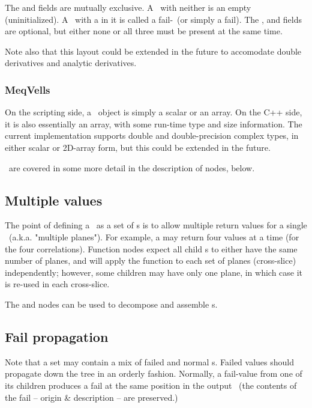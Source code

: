 \documentclass[10pt]{article}
\begin{document}
  The  and  fields are mutually exclusive. A \VellSet\ with
  neither is an empty (uninitialized). A \VellSet\ with a  in it is
  called a fail-\VellSet\ (or simply a fail). The ,
   and  fields are optional, but either
  none or all three must be present at the same time.
  
  Note also that this layout could be extended in the future to accomodate
  double derivatives and analytic derivatives.

\subsubsection{MeqVells}

  On the scripting side, a \Vells\ object is simply a scalar or an array. On
  the C++ side, it is also essentially an array, with some run-time type and
  size information. The current implementation supports double and
  double-precision complex types, in either scalar or 2D-array form, but this
  could be extended in the future.

  \Vells\ are covered in some more detail in the description of 
  nodes, below.

\subsection{Multiple values}

  The point of defining a \Result\ as a set of \VellSet{}s is to allow multiple
  return values for a single \Cells\ (a.k.a. "multiple planes"). For example, a
   may return four values at a time (for the four correlations).
  Function nodes expect all child \Result{}s to either have the same number of
  planes, and will apply the function to each set of planes (cross-slice)
  independently; however, some children may have only one plane, in which case
  it is re-used in each cross-slice.

  The  and  nodes can be used to decompose and
  assemble \Result{}s.

\subsection{Fail propagation}

  Note that a set may contain a mix of failed and normal \VellSet{}s. Failed
  values should propagate down the tree in an orderly fashion. Normally, a
  fail-value from one of its children produces a fail at the same position in
  the output \Result\ (the contents of the fail -- origin \& description -- are
  preserved.)
\end{document}
